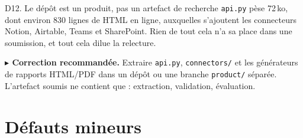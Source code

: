 \documentclass[11pt,a4paper]{article}
\newcommand{\corr}[1]{%
  \par\vspace{4pt}%
  \noindent\textbf{\textcolor{cExp}{$\blacktriangleright$ Correction recommandée.}} #1%
}
\newcommand{\fic}[1]{\texttt{\small #1}}
\begin{document}
\begin{serieux}{D12. Le dépôt est un produit, pas un artefact de recherche}
\fic{api.py} pèse 72\,ko, dont environ 830 lignes de HTML en ligne, auxquelles
s'ajoutent les connecteurs Notion, Airtable, Teams et SharePoint. Rien de tout
cela n'a sa place dans une soumission, et tout cela dilue la relecture.

\corr{Extraire \fic{api.py}, \fic{connectors/} et les générateurs de rapports
HTML/PDF dans un dépôt ou une branche \fic{product/} séparée. L'artefact soumis
ne contient que : extraction, validation, évaluation.}
\end{serieux}

\section{Défauts mineurs}
\label{sec:mineur}
\end{document}
